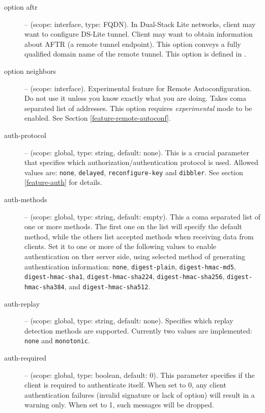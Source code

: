 \begin{description}
 \item[option aftr] -- (scope: interface, type: FQDN). In Dual-Stack Lite
   networks, client may want to configure DS-Lite tunnel. Client may
   want to obtain information about AFTR (a remote tunnel
   endpoint). This option conveys a fully qualified domain name of the
   remote tunnel. This option is defined in \cite{rfc6334}.

 \item[option neighbors] -- (scope: interface). Experimental feature
   for Remote Autoconfiguration. Do not use it unless you know exactly
   what you are doing. Takes coma separated list of addresses. This
   option requires \emph{experimental} mode to be enabled. See Section
   \ref{feature-remote-autoconf}.

\item[auth-protocol] -- (scope: global, type: string, default:
  none). This is a crucial parameter that specifies which
  authorization/authentication protocol is used. Allowed values are:
  \texttt{none}, \texttt{delayed}, \texttt{reconfigure-key} and
  \texttt{dibbler}. See section \ref{feature-auth} for details.

 \item[auth-methods] -- (scope: global, type: string, default:
   empty). This a coma separated list of one or more methods. The
   first one on the list will specify the default method, while the
   others list accepted methods when receiving data from clients.
   Set it to one or more of the following values to enable
   authentication on ther server side, using selected method of
   generating authentication information:
   \texttt{none}, \texttt{digest-plain}, \texttt{digest-hmac-md5},
   \texttt{digest-hmac-sha1}, \texttt{digest-hmac-sha224},
   \texttt{digest-hmac-sha256}, \texttt{digest-hmac-sha384},
   and \texttt{digest-hmac-sha512}. 

\item[auth-replay] -- (scope: global, type: string, default:
  none). Specifies which replay detection methods are
  supported. Currently two values are implemented: \texttt{none} and
  \texttt{monotonic}.

\item[auth-required] -- (scope: global, type: boolean, default:
  0). This parameter specifies if the client is required to
  authenticate itself. When set to 0, any client authentication
  failures (invalid signature or lack of  option) will
  result in a warning only. When set to 1, such messages will be
  dropped.


\end{description}
